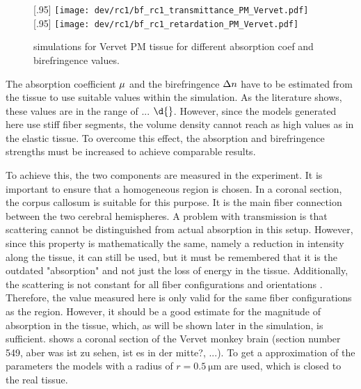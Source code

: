 % 
% 
% 
\begin{figure}[!tp]
\centering
{}[.95\textwidth]{
\texttt{[image: dev/rc1/bf\_rc1\_transmittance\_PM\_Vervet.pdf]}} %
{}[.95\textwidth]{
\texttt{[image: dev/rc1/bf\_rc1\_retardation\_PM\_Vervet.pdf]}
}
\caption{simulations for Vervet PM tissue for different absorption coef and birefringence values.}
\label{fig:parameterModelSim}
\end{figure}
% 
The absorption coefficient $\textnormal{$\mu$}{}$ and the birefringence $\textnormal{$\Delta n$}{}$ have to be estimated from the tissue to use suitable values within the simulation.
As the literature shows, these values are in the range of ... $\d{}$.
However, since the models generated here use stiff fiber segments, the volume density cannot reach as high values as in the elastic tissue.
To overcome this effect, the absorption and birefringence strengths must be increased to achieve comparable results.
\par
% 
To achieve this, the two components are measured in the experiment.
It is important to ensure that a homogeneous region is chosen.
In a coronal section, the corpus callosum is suitable for this purpose. It is the main fiber connection between the two cerebral hemispheres.
A problem with transmission is that scattering cannot be distinguished from actual absorption in this setup.
However, since this property is mathematically the same, namely a reduction in intensity along the tissue, it can still be used, but it must be remembered that it is the outdated "absorption" and not just the loss of energy in the tissue.
Additionally, the scattering is not constant for all fiber configurations and orientations \dummy{}.
Therefore, the value measured here is only valid for the same fiber configurations as the region.
However, it should be a good estimate for the magnitude of absorption in the tissue, which, as will be shown later in the simulation, is sufficient.
% 
 shows a coronal section of the Vervet monkey brain \dummy(section number 549, aber was ist zu sehen, ist es in der mitte?, ...).
% 
To get a approximation of the parameters the models with a radius of $r=\SI{0.5}{\micro\meter}$ are used, which is closed to the real tissue.
% 
% 
% 
